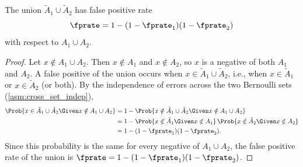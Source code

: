 \begin{theorem}
\label{thm:union_fprate}
The union $\tilde{A}_1 \cup \tilde{A}_2$ has false positive rate
\begin{equation}
\label{eq:union_fpr}
\fprate = 1 - (1 - \fprate_1)(1 - \fprate_2)
\end{equation}
with respect to $A_1 \cup A_2$.
\end{theorem}
\begin{proof}
Let $x \notin A_1 \cup A_2$.
Then $x \notin A_1$ and $x \notin A_2$, so $x$ is a negative of both
$A_1$ and $A_2$.
A false positive of the union occurs when
$x \in \tilde{A}_1 \cup \tilde{A}_2$, i.e., when
$x \in \tilde{A}_1$ or $x \in \tilde{A}_2$ (or both).
By the independence of errors across the two Bernoulli sets (\cref{asm:cross_set_indep}),
\begin{align}
\Prob{x \in \tilde{A}_1 \cup \tilde{A}_2 \Given x \notin A_1 \cup A_2}
&= 1 - \Prob{x \notin \tilde{A}_1 \cup \tilde{A}_2
    \Given x \notin A_1 \cup A_2} \\
&= 1 - \Prob{x \notin \tilde{A}_1 \Given x \notin A_1}\,
       \Prob{x \notin \tilde{A}_2 \Given x \notin A_2} \\
&= 1 - (1 - \fprate_1)(1 - \fprate_2).
\end{align}
Since this probability is the same for every negative of $A_1 \cup A_2$,
the false positive rate of the union is
$\fprate = 1 - (1 - \fprate_1)(1 - \fprate_2)$.
\end{proof}

